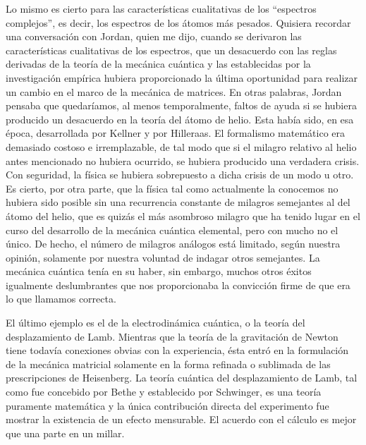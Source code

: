 \documentclass[a4paper, 12pt]{article}
\begin{document}
Lo mismo es cierto para las características cualitativas de los ``espectros complejos'', es decir, los espectros de los átomos más pesados. Quisiera recordar una conversación con Jordan, quien me dijo, cuando se derivaron las características cualitativas de los espectros, que un desacuerdo con las reglas derivadas de la teoría de la mecánica cuántica y las establecidas por la investigación empírica hubiera proporcionado la última oportunidad para realizar un cambio en el marco de la mecánica de matrices. En otras palabras, Jordan pensaba que quedaríamos, al menos temporalmente, faltos de ayuda si se hubiera producido un desacuerdo en la teoría del átomo de helio. Esta había sido, en esa época, desarrollada por Kellner y por Hilleraas.  El formalismo matemático era demasiado costoso e irremplazable, de tal modo que  si el milagro relativo al helio antes mencionado no hubiera ocurrido, se hubiera producido una verdadera crisis. Con seguridad, la física se hubiera sobrepuesto a dicha crisis de un modo u otro. Es cierto, por otra parte, que la física tal como actualmente la conocemos no hubiera sido posible sin una recurrencia constante de milagros semejantes al del átomo del helio, que es quizás el más asombroso milagro que ha tenido lugar en el curso del desarrollo de la mecánica cuántica elemental, pero con mucho no el único. De hecho, el número de milagros análogos está limitado, según nuestra opinión, solamente por nuestra voluntad de indagar otros semejantes. La mecánica cuántica tenía en su haber, sin embargo, muchos otros éxitos igualmente deslumbrantes que nos proporcionaba la convicción firme de que era lo que llamamos correcta.

El último ejemplo es el de la electrodinámica cuántica, o la teoría del desplazamiento de Lamb. Mientras que la teoría de la gravitación de Newton tiene todavía conexiones obvias con la experiencia, ésta entró en la formulación de la mecánica matricial solamente en la forma refinada o sublimada de las prescripciones de Heisenberg. La teoría cuántica del desplazamiento de Lamb, tal como fue concebido por Bethe y establecido por Schwinger, es una teoría puramente matemática y la única contribución directa del experimento fue mostrar la existencia de un efecto mensurable. El acuerdo con el cálculo es mejor que una parte en un millar.
\end{document}
